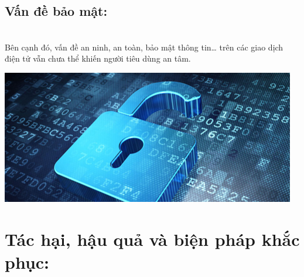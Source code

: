 \documentclass[13pt,a4paper]{article}
\begin{document}
    \subsection{Vấn đề bảo mật:}\\
    Bên cạnh đó, vấn đề an ninh, an toàn, bảo mật thông tin… trên các giao dịch điện tử vẫn chưa thể khiến người tiêu dùng an tâm.
    \begin{center}
    \includegraphics[scale=0.8]{images/khoa.png} \\
    \fontsize{10pt}{1.2pt}\selectfont
    \end{center}
    
\section{Tác hại, hậu quả và biện pháp khắc phục:}



	
	


\newpage
\end{document}
